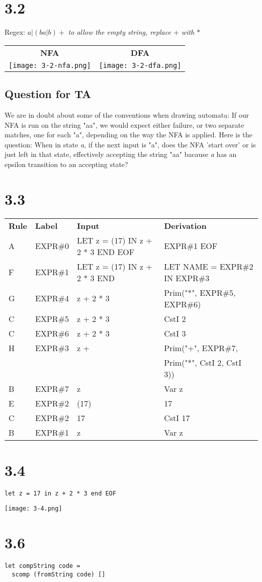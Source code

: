 \documentclass{article}
\begin{document}
\section*{3.2}

Regex: $a|(ba|b)+$
\newline\textit{to allow the empty string, replace $+$ with $*$}

\vspace{10 mm}

\begin{tabular}{c c}
\textbf{NFA} & \textbf{DFA} \\
\texttt{[image: 3-2-nfa.png]} &
	\texttt{[image: 3-2-dfa.png]}
\end{tabular}
\subsection*{Question for TA}
We are in doubt about some of the conventions when drawing automata:
If our NFA is run on the string "aa", we would expect either failure, or
two separate matches, one for each "a", depending on the way the NFA is applied.
Here is the question: When in state \emph{a}, if the next input is "a", does the
NFA 'start over' or is just left in that state, effectively accepting the string
"aa" bacause \emph{a} has an epsilon transition to an accepting state?

\section*{3.3}

\begin{tabular}{l l l l}
\textbf{Rule} & \textbf{Label} & \textbf{Input} & \textbf{Derivation} \\
A & EXPR\#0 & LET z = (17) IN z + 2 * 3 END EOF & EXPR\#1 EOF \\
F & EXPR\#1 & LET z = (17) IN z + 2 * 3 END & LET NAME = EXPR\#2 IN EXPR\#3 \\
G & EXPR\#4 & z + 2 * 3 & Prim("*", EXPR\#5, EXPR\#6) \\
C & EXPR\#5 & z + 2 * 3 & CstI 2 \\
C & EXPR\#6 & z + 2 * 3 & CstI 3 \\
H & EXPR\#3 & z + & Prim("+", EXPR\#7, \\
  &         &     & \quad Prim("*", CstI 2, CstI 3)) \\
B & EXPR\#7 & z & Var z \\
E & EXPR\#2 & (17) & 17 \\
C & EXPR\#2 & 17 & CstI 17 \\
B & EXPR\#1 & z & Var z 
\end{tabular}

\section*{3.4}
\begin{verbatim}
let z = 17 in z + 2 * 3 end EOF
\end{verbatim}
\texttt{[image: 3-4.png]}

\section*{3.6}

\begin{verbatim}
let compString code = 
  scomp (fromString code) []
\end{verbatim}
\end{document}
